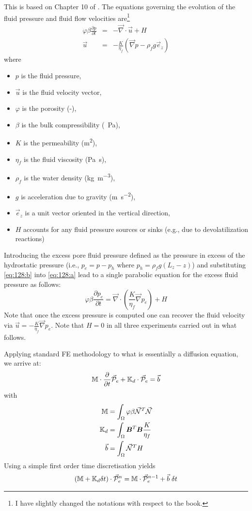 This \stone is based on Chapter 10 of .
The equations governing the evolution of the fluid pressure 
and fluid flow velocities are\footnote{I have slightly changed the notations with respect to the book.}
\begin{eqnarray}
\varphi \beta \frac{\partial p}{\partial t} &=& -\vec\nabla \cdot \vec{u} + H \label{eq:128:a}\\
\vec{u} &=& -\frac{K}{\eta_f} \left(\vec\nabla p - \rho_f g \vec{e}_z \right) \label{eq:128:b}
\end{eqnarray}
where
\begin{itemize}
\item $p$ is the fluid pressure, 
\item $\vec{u}$ is the fluid velocity vector, 
\item $\varphi$ is the porosity (-), 
\item $\beta$ is the bulk compressibility (\si{\per\pascal}), 
\item $K$ is the permeability (\si{\square\meter}), 
\item $\eta_f$ is the fluid viscosity (\si{\pascal\second}), 
\item $\rho_f$ is the water density (\si{\kg\per\cubic\meter}), 
\item $g$ is acceleration due to gravity (\si{\meter\per\square\second}), 
\item $\vec{e}_z$ is a unit vector oriented in the vertical direction, 
\item $H$ accounts for any fluid pressure sources or sinks (e.g., due to devolatilization reactions)
\end{itemize}
Introducing the excess pore fluid pressure defined as the pressure in excess of the hydrostatic pressure 
(i.e., $p_e = p-p_h$ where $p_h = \rho_f g (L_z-z)$) and 
substituting \eqref{eq:128:b} into \eqref{eq:128:a} lead to a single parabolic equation for
the excess fluid pressure as follows:
\begin{equation}
\varphi \beta  \frac{\partial p_e}{\partial t}
=
\vec\nabla \cdot \left( \frac{K}{\eta_f} \vec\nabla p_e  \right) + H
\end{equation}
Note that once the excess pressure is computed one can recover the fluid velocity via 
$\vec{u}=-\frac{K}{\eta_f} \vec\nabla p_e$. 
Note that $H=0$ in all three experiments carried out in what follows.

Applying standard FE methodology to what is essentially a diffusion equation, we arrive at:
\[
{{\mathbb{M}}} \cdot \frac{\partial}{\partial t} \vec{\cal P}_e + {{\mathbb{K}}}_d \cdot \vec{\cal P}_e = \vec{b}
\]
with
\begin{align}
{{\mathbb{M}}} &= \int_\Omega \varphi \beta \vec{{\mathcal{N}}}^T \vec{{\mathcal{N}}} \nonumber \\
{\mathbb{K}}_d &= \int_\Omega {\bm B}^T {\bm B} \frac{K}{\eta_f} \nonumber \\
\vec{b} &= \int_\Omega \vec{{\mathcal{N}}}^T  H \nonumber
\end{align}
Using a simple first order time discretisation yields
\[
({{\mathbb{M}}} + {{\mathbb{K}}}_d \delta t) \cdot \vec{\cal P}_e^n = {\mathbb{M}} \cdot \vec{\cal P}_e^{n-1} + \vec{b} \; \delta t
\]



